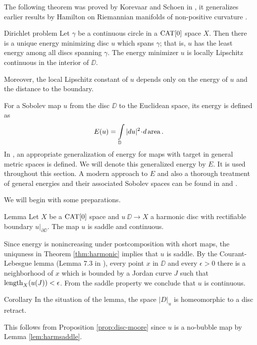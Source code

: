 \documentclass[a4paper,10pt]{amsart}
\begin{document}
The following theorem was proved by Korevaar and Schoen in \cite{KS}, it generalizes earlier results by Hamilton on Riemannian manifolds of non-positive
curvature \cite{H}.

\begin{thm}{Dirichlet problem}\label{thm:dirichlet}
Let $\gamma$ be a continuous circle in a $\mathop{\rm CAT}\nolimits[0]$ space $X$. 
Then there is a unique energy minimizing disc $u$ which spans $\gamma$; 
that is, $u$
has the least energy among all discs spanning $\gamma$. 
The energy minimizer $u$ is locally Lipschitz continuous in the interior of $\DD$.

Moreover, the local Lipschitz constant of $u$ depends only on the energy of $u$ and the distance to the boundary.
\end{thm}

For a Sobolev map $u$ from the disc $\DD$ to the Euclidean space, its energy is defined as 
\[E(u)=\int\limits_\DD|du|^2\cdot d\area.\]
In \cite{KS}, an appropriate generalization of energy for maps with target in general metric spaces is defined.
We will denote this generalized energy by $E$. It is used throughout this section. 
A modern approach to $E$ and also a thorough treatment of general energies and their associated Sobolev
spaces can be found in \cite{LW} and \cite{LW2}.



We will begin with some preparations. 


\begin{thm}{Lemma}\label{lem:harmsaddle}
Let $X$ be a $\mathop{\rm CAT}\nolimits[0]$ space and
$u\:\DD\to X$ a harmonic disc with rectifiable boundary $u|_{\partial \DD}$.
The map $u$ is saddle and continuous.
\end{thm}

Since energy is nonincreasing under postcomposition with short maps, the uniquness in Theorem \ref{thm:harmonic} implies that
$u$ is saddle. By the Courant-Lebesgue lemma (Lemma 7.3 in \cite{LW}), every point $x$ in $\DD$ and every $\epsilon>0$
there is a neighborhood of $x$ which is bounded by a Jordan curve $J$ such that $\mathop{\rm length}\nolimits_X(u(J))<\epsilon$. From the saddle property we conclude 
that $u$ is continuous.
\qeds

\begin{thm}{Corollary}\label{cor:harmdiscretract}
In the situation of the lemma, the space $|D|_u$ is homeomorphic to a disc retract.
\end{thm}
This follows from Proposition \ref{prop:disc-moore} since $u$ is a no-bubble map by Lemma \ref{lem:harmsaddle}.
\qeds
\end{document}
